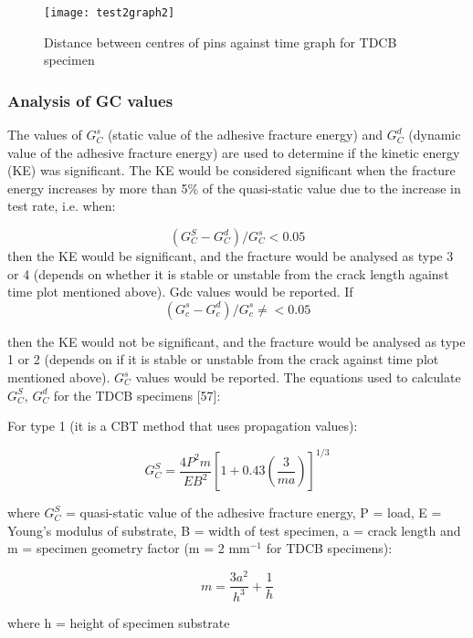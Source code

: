 \documentclass[numbers=noendperiod,chapterprefix=on]{icldt} %
\begin{document}
\begin{figure}[!htpb]
\centering
\texttt{[image: test2graph2]}
\caption{Distance between centres of pins against time graph for TDCB specimen } %
\end{figure}

\subsubsection{Analysis of GC values}
The values of $G^s_C$ (static value of the adhesive fracture energy) and $G^d_C$ (dynamic value of the adhesive fracture energy) are used to determine if the kinetic energy (KE) was significant. The KE would be considered significant when the fracture energy increases by more than 5\% of the quasi-static value due to the increase in test rate, i.e. when: 

\begin{equation} 
(G_C^S  - G_C^d)/G_C^s< 0.05
\end{equation}
then the KE would be significant, and the fracture would be analysed as type 3 or 4 (depends on whether it is stable or unstable from the crack length against time plot mentioned above). Gdc values would be reported.
If
\begin{equation} 
(G_c^s  - G_c^d)/G_c^s\neq< 0.05
\end{equation}

then the KE would not be significant, and the fracture would be analysed as type 1 or 2 (depends on if it is stable or unstable from the crack against time plot mentioned above). $G^s_C$ values would be reported. The equations used to calculate $G^S_C$, $G^d_C$ for the TDCB specimens [57]: 

For type 1 (it is a CBT method that uses propagation values): 

\begin{equation} 
G_C^S= \frac{4P^2 m}{EB^2} \left[1+0.43\left( \frac{3}{ma}\right) \right] ^{1/3}
\end{equation}

where $G^S_C$ = quasi-static value of the adhesive fracture energy, P = load, E = Young’s modulus of substrate, B = width of test specimen, a = crack length and m = specimen geometry factor (m = 2 mm$^{-1}$ for TDCB specimens):


\begin{equation} 
m=\frac{3a^2}{h^3}+\frac{1}{h}
\end{equation}

where h = height of specimen substrate
\end{document}
